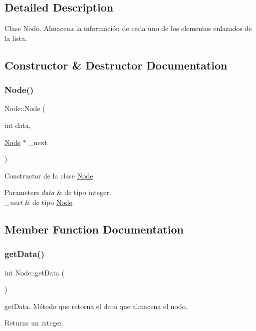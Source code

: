 \subsection{Detailed Description}
Clase Nodo. Almacena la información de cada uno de los elementos enlazados de la lista. 

\subsection{Constructor \& Destructor Documentation}
\mbox{\label{classNode_af93785746fd98a394a2295ba2b1f523c}} 
\subsubsection{\texorpdfstring{Node()}{Node()}}
{\footnotesize\ttfamily Node\+::\+Node (\begin{DoxyParamCaption}\item[{int}]{data,  }\item[{\hyperlink{classNode}{Node} $\ast$}]{\+\_\+next }\end{DoxyParamCaption})}

Constructor de la clase \hyperlink{classNode}{Node}. 
\begin{DoxyParams}{Parameters}
{\em data} & de tipo integer. \\
\hline
{\em \+\_\+next} & de tipo \hyperlink{classNode}{Node}. \\
\hline
\end{DoxyParams}


\subsection{Member Function Documentation}
\mbox{\label{classNode_aca98907146d5d0687f48bf8be9df9b7d}} 
\subsubsection{\texorpdfstring{get\+Data()}{getData()}}
{\footnotesize\ttfamily int Node\+::get\+Data (\begin{DoxyParamCaption}{ }\end{DoxyParamCaption})}

get\+Data. Método que retorna el dato que almacena el nodo. \begin{DoxyReturn}{Returns}
un integer. 
\end{DoxyReturn}
\mbox{\label{classNode_a57a5b45f2cac01a9df29355e579c3e9e}} 

